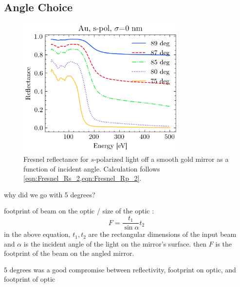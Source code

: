 \subsection{Angle Choice}
\begin{figure}
	\centering
	\includegraphics[width=0.75\textwidth]{figures/chap2/Au_ReflvsAngle.png}
	\caption{Fresnel reflectance for $s$-polarized light off a smooth gold mirror as a function of incident angle. Calculation follows \cref{eqn:Fresnel_Rs_2,eqn:Fresnel_Rp_2}.}
	\label{fig:Au_ReflvsAngle}
\end{figure}

why did we go with 5 degrees?

footprint of beam on the optic / size of the optic \cite{gibaudSpecularReflectivitySmooth2009}:
\begin{equation}
F = \frac{t_1}{\sin \alpha}t_2
\label{eqn:EM_footprint}
\end{equation}
in the above equation, $t_1, t_2$ are the rectangular dimensions of the input beam and $\alpha$ is the incident angle of the light on the mirror's surface. then $F$ is the footprint of the beam on the angled mirror.

5 degrees was a good compromise between reflectivity, footprint on optic, and footprint of optic

